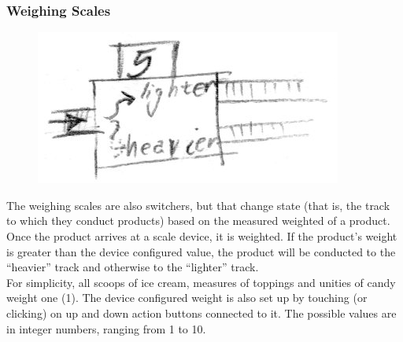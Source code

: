 \documentclass[a4paper]{scrartcl}
\begin{document}
        \subsubsection{Weighing Scales}
            \begin{minipage}[t][10em][t]{\textwidth}
                \begin{figure}
                    \vspace{-20pt}
                    \includegraphics[scale=1]{devices/scale}
                    \vspace{-20pt}
                \end{figure}

                The weighing scales are also switchers, but that change state
                (that is, the track to which they conduct products) based on the
                measured weighted of a product. Once the product arrives at a
                scale device, it is weighted. If the product's weight is greater
                than the device configured value, the product will be conducted
                to the ``heavier'' track and otherwise to the ``lighter'' track.
                \\
                For simplicity, all scoops of ice cream, measures of toppings
                and unities of candy weight one (1). The device configured
                weight is also set up by touching (or clicking) on up and down
                action buttons connected to it. The possible values are in
                integer numbers, ranging from 1 to 10.
            \end{minipage}
\end{document}
